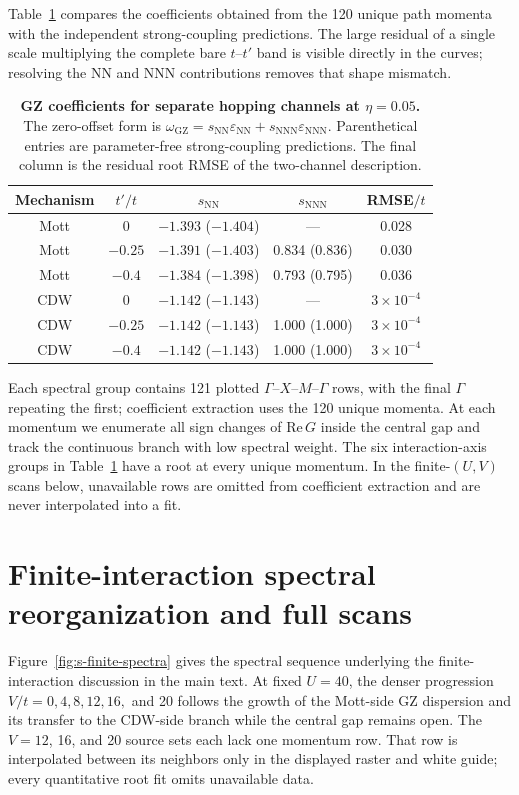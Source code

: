 \documentclass[10pt]{article}
\newcommand{\tp}{t'}
\newcommand{\wzero}{\omega_{\mathrm{GZ}}}
\newcommand{\ReG}{\mathrm{Re}\,G}
\begin{document}
Table~\ref{tab:s-hopping-channel-tests} compares the coefficients obtained from the 120 unique path momenta with the independent strong-coupling predictions. The large residual of a single scale multiplying the complete bare $t$--$\tp$ band is visible directly in the curves; resolving the NN and NNN contributions removes that shape mismatch.
\begin{table}[H]
\centering
\caption{\textbf{GZ coefficients for separate hopping channels at $\eta=0.05$.} The zero-offset form is $\wzero=s_{\mathrm{NN}}\varepsilon_{\mathrm{NN}}+s_{\mathrm{NNN}}\varepsilon_{\mathrm{NNN}}$. Parenthetical entries are parameter-free strong-coupling predictions. The final column is the residual root RMSE of the two-channel description.}
\label{tab:s-hopping-channel-tests}
\small
\begin{tabular}{ccccc}
\toprule
Mechanism & $\tp/t$ & $s_{\mathrm{NN}}$ & $s_{\mathrm{NNN}}$ & RMSE$/t$ \\
\midrule
Mott & $0$     & $-1.393$ ($-1.404$) & ---                & 0.028 \\
Mott & $-0.25$ & $-1.391$ ($-1.403$) & 0.834 (0.836)      & 0.030 \\
Mott & $-0.4$  & $-1.384$ ($-1.398$) & 0.793 (0.795)      & 0.036 \\
\addlinespace
CDW  & $0$     & $-1.142$ ($-1.143$) & ---                & $3\times10^{-4}$ \\
CDW  & $-0.25$ & $-1.142$ ($-1.143$) & 1.000 (1.000)      & $3\times10^{-4}$ \\
CDW  & $-0.4$  & $-1.142$ ($-1.143$) & 1.000 (1.000)      & $3\times10^{-4}$ \\
\bottomrule
\end{tabular}
\end{table}

Each spectral group contains 121 plotted $\Gamma$--$X$--$M$--$\Gamma$ rows, with the final $\Gamma$ repeating the first; coefficient extraction uses the 120 unique momenta. At each momentum we enumerate all sign changes of $\ReG$ inside the central gap and track the continuous branch with low spectral weight. The six interaction-axis groups in Table~\ref{tab:s-hopping-channel-tests} have a root at every unique momentum. In the finite-$(U,V)$ scans below, unavailable rows are omitted from coefficient extraction and are never interpolated into a fit.

\section{Finite-interaction spectral reorganization and full scans}
Figure~\ref{fig:s-finite-spectra} gives the spectral sequence underlying the finite-interaction discussion in the main text. At fixed $U=40$, the denser progression $V/t=0,4,8,12,16,$ and 20 follows the growth of the Mott-side GZ dispersion and its transfer to the CDW-side branch while the central gap remains open. The $V=12$, 16, and 20 source sets each lack one momentum row. That row is interpolated between its neighbors only in the displayed raster and white guide; every quantitative root fit omits unavailable data.
\end{document}
